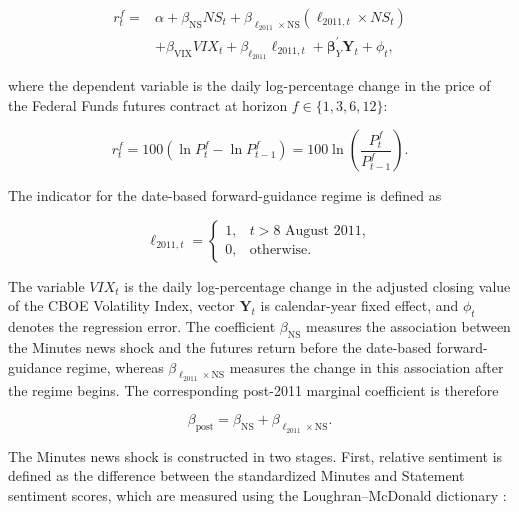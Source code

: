 \begin{equation}
\label{eq:ch2:tadle_ff_regression}
\begin{aligned}
r_t^f
={}&
\alpha
+\beta_{\mathrm{NS}}NS_t
+\beta_{\ell_{2011}\times\mathrm{NS}}
 \left(\ell_{2011,t}\times NS_t\right) \\
&+\beta_{\mathrm{VIX}}VIX_t
+\beta_{\ell_{2011}}\ell_{2011,t}
+\boldsymbol{\beta}_{Y}^{\prime}\mathbf{Y}_t
+\phi_t ,
\end{aligned}
\end{equation}

where the dependent variable is the daily log-percentage change in the price of the Federal Funds futures contract at horizon
\(f\in\{1,3,6,12\}\):

\begin{equation}
\label{eq:ch2:ff_return}
r_t^f
=
100\left(\ln P_t^f-\ln P_{t-1}^f\right)
=
100\ln\left(\frac{P_t^f}{P_{t-1}^f}\right).
\end{equation}

The indicator for the date-based forward-guidance regime is defined as

\begin{equation}
\label{eq:ch2:post2011_indicator}
\ell_{2011,t}
=
\begin{cases}
1, & t>\text{8 August 2011},\\
0, & \text{otherwise}.
\end{cases}
\end{equation}

The variable \(VIX_t\) is the daily log-percentage change in the
adjusted closing value of the CBOE Volatility Index, vector \(\mathbf{Y}_t\) is calendar-year fixed effect, and \(\phi_t\) denotes the regression error. The coefficient \(\beta_{\mathrm{NS}}\) measures the association between the Minutes news shock and the futures return before the date-based forward-guidance regime, whereas \(\beta_{\ell_{2011}\times\mathrm{NS}}\) measures the change in this association after the regime begins. The corresponding post-2011 marginal coefficient is therefore


\begin{equation}
\label{eq:ch2:post2011_marginal_beta}
\beta_{\mathrm{post}}
=
\beta_{\mathrm{NS}}
+
\beta_{\ell_{2011}\times\mathrm{NS}}.
\end{equation}

The Minutes news shock is constructed in two stages. First, relative sentiment is defined as the difference between the standardized Minutes and Statement sentiment scores, which are measured using the Loughran--McDonald dictionary \citep{loughran2011liability}:

